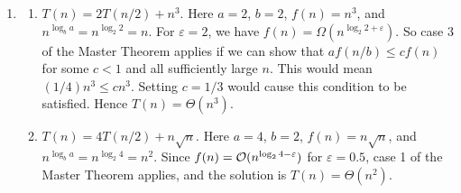 \documentclass{article}
\begin{document}
\begin{enumerate}[leftmargin={*}, font={\bf}, label={\arabic*.}, ref={\arabic*}]
  \item \label{qst:3}
    \begin{enumerate}
      \item \label{qst:3a}
        $T(n) = 2T(n/2) + n^3$. Here $a = 2$, $b = 2$, $f(n) = n^3$, and $n^{\log_b a} = n^{\log_2
        2} = n$.  For $\varepsilon = 2$, we have $f(n) = \Omega(n^{\log_2 2 + \varepsilon})$. So
        case $3$ of the Master Theorem applies if we can show that $af(n/b) \leq cf(n)$ for some $c
        < 1$ and all sufficiently large $n$. This would mean $(1/4)n^3 \leq cn^3$. Setting $c = 
        1/3$ would cause this condition to be satisfied. Hence $T(n) = \Theta(n^3)$.

      \item \label{qst:3b}
        $T(n) = 4T(n/2) + n\sqrt{n}$. Here $a = 4$, $b = 2$, $f(n) = n\sqrt{n}$, and $n^{\log_b a}
        = n^{\log_2 4} = n^2$. Since $f(n) = \operatorname*{\mathcal{O}}(n^{\log_2 4 - \varepsilon})$ for $\varepsilon = 0.5$,
        case 1 of the Master Theorem applies, and the solution is $T(n) = \Theta(n^2)$.


\end{enumerate}
\end{enumerate}
\end{document}

